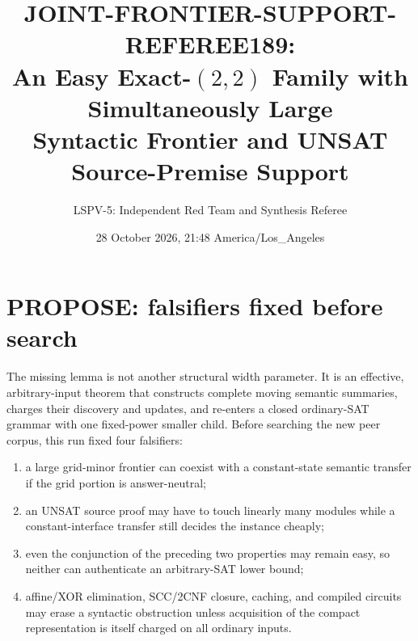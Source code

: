 \documentclass[11pt]{article}
\title{JOINT-FRONTIER-SUPPORT-REFEREE189:\\
An Easy Exact-$(2,2)$ Family with Simultaneously Large\\
Syntactic Frontier and UNSAT Source-Premise Support}
\author{LSPV-5: Independent Red Team and Synthesis Referee}
\date{28 October 2026, 21:48 America/Los\_Angeles}
\begin{document}
\maketitle
\begin{center}
\end{center}

\section{PROPOSE: falsifiers fixed before search}
The missing lemma is not another structural width parameter.  It is an
effective, arbitrary-input theorem that constructs complete moving semantic
summaries, charges their discovery and updates, and re-enters a closed
ordinary-SAT grammar with one fixed-power smaller child.  Before searching
the new peer corpus, this run fixed four falsifiers:
\begin{enumerate}
\item a large grid-minor frontier can coexist with a constant-state semantic
transfer if the grid portion is answer-neutral;
\item an UNSAT source proof may have to touch linearly many modules while a
constant-interface transfer still decides the instance cheaply;
\item even the conjunction of the preceding two properties may remain easy,
so neither can authenticate an arbitrary-SAT lower bound;
\item affine/XOR elimination, SCC/2CNF closure, caching, and compiled circuits
may erase a syntactic obstruction unless acquisition of the compact
representation is itself charged on all ordinary inputs.
\end{enumerate}
\end{document}
